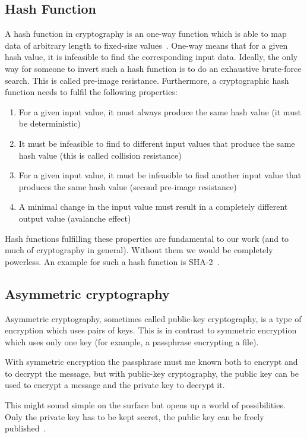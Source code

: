 \subsection{Hash Function}\label{subsec:hash-function}
A hash function in cryptography is an one-way function which is able to map data of arbitrary length to fixed-size values~\cite{hashing}.
One-way means that for a given hash value, it is infeasible to find the corresponding input data.
Ideally, the only way for someone to invert such a hash function is to do an exhaustive brute-force search.
This is called pre-image resistance.
Furthermore, a cryptographic hash function needs to fulfil the following properties:
\begin{enumerate}
    \item For a given input value, it must always produce the same hash value (it must be deterministic)
    \item It must be infeasible to find to different input values that produce the same hash value (this is called collision resistance)
    \item For a given input value, it must be infeasible to find another input value that produces the same hash value (second pre-image resistance)
    \item A minimal change in the input value must result in a completely different output value (avalanche effect)
\end{enumerate}

Hash functions fulfilling these properties are fundamental to our work (and to much of cryptography in general).
Without them we would be completely powerless.
An example for such a hash function is \gls{SHA-2}~\cite{sha2patent}.

\subsection{Asymmetric cryptography}\label{subsec:asymmetric-cryptography}
Asymmetric cryptography, sometimes called public-key cryptography, is a type of encryption which uses pairs of keys.
This is in contrast to symmetric encryption which uses only one key (for example, a passphrase encrypting a file).

With symmetric encryption the passphrase must me known both to encrypt and to decrypt the message,
but with public-key cryptography, the public key can be used to encrypt a message and the private key to decrypt it.

This might sound simple on the surface but opens up a world of possibilities.
Only the private key has to be kept secret, the public key can be freely published~\cite{stallings}.

